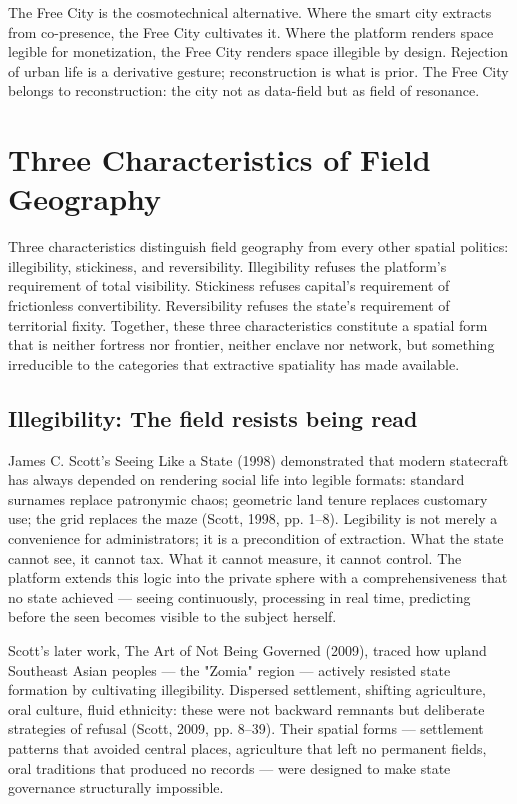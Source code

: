 The Free City is the cosmotechnical alternative. Where the smart city extracts from co-presence, the Free City cultivates it. Where the platform renders space legible for monetization, the Free City renders space illegible by design. Rejection of urban life is a derivative gesture; reconstruction is what is prior. The Free City belongs to reconstruction: the city not as data-field but as field of resonance.

\section{Three Characteristics of Field Geography}

Three characteristics distinguish field geography from every other spatial politics: illegibility, stickiness, and reversibility. Illegibility refuses the platform's requirement of total visibility. Stickiness refuses capital's requirement of frictionless convertibility. Reversibility refuses the state's requirement of territorial fixity. Together, these three characteristics constitute a spatial form that is neither fortress nor frontier, neither enclave nor network, but something irreducible to the categories that extractive spatiality has made available.

\subsection{Illegibility: The field resists being read}

James C. Scott's Seeing Like a State (1998) demonstrated that modern statecraft has always depended on rendering social life into legible formats: standard surnames replace patronymic chaos; geometric land tenure replaces customary use; the grid replaces the maze (Scott, 1998, pp. 1–8). Legibility is not merely a convenience for administrators; it is a precondition of extraction. What the state cannot see, it cannot tax. What it cannot measure, it cannot control. The platform extends this logic into the private sphere with a comprehensiveness that no state achieved — seeing continuously, processing in real time, predicting before the seen becomes visible to the subject herself.

Scott's later work, The Art of Not Being Governed (2009), traced how upland Southeast Asian peoples — the "Zomia" region — actively resisted state formation by cultivating illegibility. Dispersed settlement, shifting agriculture, oral culture, fluid ethnicity: these were not backward remnants but deliberate strategies of refusal (Scott, 2009, pp. 8–39). Their spatial forms — settlement patterns that avoided central places, agriculture that left no permanent fields, oral traditions that produced no records — were designed to make state governance structurally impossible.

